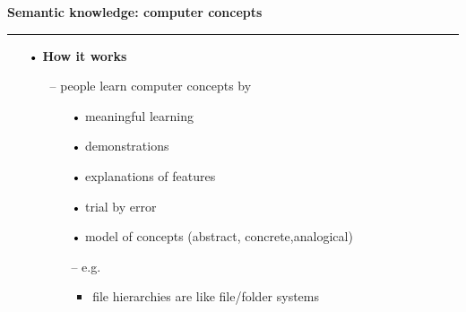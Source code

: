 \documentclass[pdf]{beamer}
\begin{document}
\begin{frame}
\vspace{8mm}
\textcolor{myBlue}{\textbf{\Large{Semantic knowledge: computer concepts}}}

\textcolor{red}{\rule{10cm}{1mm}}

\begin{small}
\begin{itemize}    
\item[\textcolor{black}{•}] \textbf{How it works}

    \begin{itemize}
    \item[\textcolor{black}{--}] people learn computer concepts by
          \begin{itemize}
          \item[\textcolor{black}{•}] meaningful learning
          \item[\textcolor{black}{•}] demonstrations
          \item[\textcolor{black}{•}] explanations of features
          \item[\textcolor{black}{•}] trial by error
          \item[\textcolor{black}{•}] model of concepts (abstract, concrete,analogical)
          \item[\textcolor{black}{--}] e.g. 
			\begin{itemize}
			\item file hierarchies are like file/folder systems
			\end{itemize}			          

          \end{itemize}
     \end{itemize}
\end{itemize}
\end{small}
\end{frame}
\end{document}
